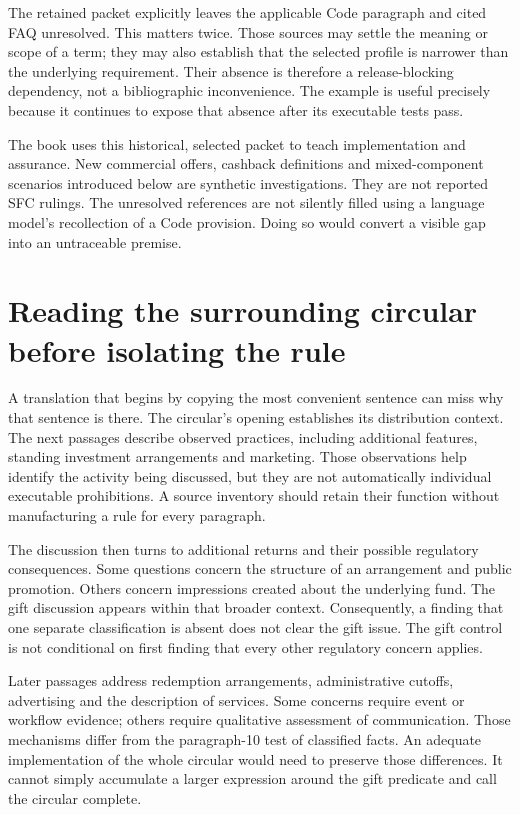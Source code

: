 The retained packet explicitly leaves the applicable Code paragraph and cited
FAQ unresolved. This matters twice. Those sources may settle the meaning or
scope of a term; they may also establish that the selected profile is narrower
than the underlying requirement. Their absence is therefore a release-blocking
dependency, not a bibliographic inconvenience. The example is useful precisely
because it continues to expose that absence after its executable tests pass.

The book uses this historical, selected packet to teach implementation and
assurance. New commercial offers, cashback definitions and mixed-component
scenarios introduced below are synthetic investigations. They are not reported
SFC rulings. The unresolved references are not silently filled using a language
model's recollection of a Code provision. Doing so would convert a visible gap
into an untraceable premise.

\section{Reading the surrounding circular before isolating the rule}
\label{merge:M02:01}

\label{sec:circular-context}
A translation that begins by copying the most convenient sentence can miss why
that sentence is there. The circular's opening establishes its distribution
context. The next passages describe observed practices, including additional
features, standing investment arrangements and marketing. Those observations
help identify the activity being discussed, but they are not automatically
individual executable prohibitions. A source inventory should retain their
function without manufacturing a rule for every paragraph.

The discussion then turns to additional returns and their possible regulatory
consequences. Some questions concern the structure of an arrangement and public
promotion. Others concern impressions created about the underlying fund. The
gift discussion appears within that broader context. Consequently, a finding
that one separate classification is absent does not clear the gift issue. The
gift control is not conditional on first finding that every other regulatory
concern applies.


Later passages address redemption arrangements, administrative cutoffs,
advertising and the description of services. Some concerns require event or
workflow evidence; others require qualitative assessment of communication.
Those mechanisms differ from the paragraph-10 test of classified facts. An adequate
implementation of the whole circular would need to preserve those differences.
It cannot simply accumulate a larger expression around the gift predicate and
call the circular complete.

